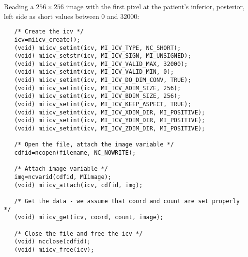 Reading a $256 \times 256$ image with the first pixel at the patient's
inferior, posterior, left side as short values between 0 and 32000:
\begin{verbatim}
   /* Create the icv */
   icv=miicv_create();
   (void) miicv_setint(icv, MI_ICV_TYPE, NC_SHORT);
   (void) miicv_setstr(icv, MI_ICV_SIGN, MI_UNSIGNED);
   (void) miicv_setint(icv, MI_ICV_VALID_MAX, 32000);
   (void) miicv_setint(icv, MI_ICV_VALID_MIN, 0);
   (void) miicv_setint(icv, MI_ICV_DO_DIM_CONV, TRUE);
   (void) miicv_setint(icv, MI_ICV_ADIM_SIZE, 256);
   (void) miicv_setint(icv, MI_ICV_BDIM_SIZE, 256);
   (void) miicv_setint(icv, MI_ICV_KEEP_ASPECT, TRUE);
   (void) miicv_setint(icv, MI_ICV_XDIM_DIR, MI_POSITIVE);
   (void) miicv_setint(icv, MI_ICV_YDIM_DIR, MI_POSITIVE);
   (void) miicv_setint(icv, MI_ICV_ZDIM_DIR, MI_POSITIVE);

   /* Open the file, attach the image variable */
   cdfid=ncopen(filename, NC_NOWRITE);

   /* Attach image variable */
   img=ncvarid(cdfid, MIimage);
   (void) miicv_attach(icv, cdfid, img);

   /* Get the data - we assume that coord and count are set properly */
   (void) miicv_get(icv, coord, count, image);

   /* Close the file and free the icv */
   (void) ncclose(cdfid);
   (void) miicv_free(icv);
\end{verbatim}




